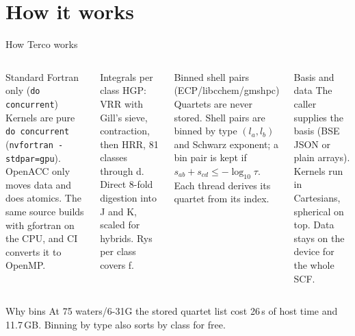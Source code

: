 \documentclass[aspectratio=169]{beamer}
\begin{document}
\section{How it works}

\begin{frame}{How Terco works}
  \footnotesize
  \begin{columns}[T,onlytextwidth]
      \begin{block}{Standard Fortran only (\texttt{do concurrent})}
        Kernels are pure \texttt{do concurrent} (\texttt{nvfortran -stdpar=gpu}). OpenACC only moves data and does atomics. The same source builds with gfortran on the CPU, and CI converts it to OpenMP.
      \end{block}
      \begin{block}{Integrals per class}
        HGP: VRR with Gill's sieve, contraction, then HRR, 81 classes through d. Direct 8-fold digestion into J and K, scaled for hybrids. Rys per class covers f.
      \end{block}
      \begin{block}{Binned shell pairs (ECP/libcchem/gmshpc)}
        Quartets are never stored. Shell pairs are binned by type $(l_a,l_b)$ and Schwarz exponent; a bin pair is kept if $s_{ab}+s_{cd}\le-\log_{10}\tau$. Each thread derives its quartet from its index.
      \end{block}
      \begin{block}{Basis and data}
        The caller supplies the basis (BSE JSON or plain arrays). Kernels run in Cartesians, spherical on top. Data stays on the device for the whole SCF.
      \end{block}
  \end{columns}
  \begin{alertblock}{Why bins}
    At 75 waters/6-31G the stored quartet list cost 26\,s of host time and 11.7\,GB. Binning by type also sorts by class for free.
  \end{alertblock}
\end{frame}
\end{document}

